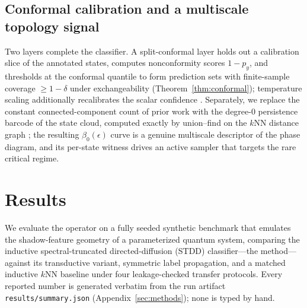 \documentclass[aps,prresearch,reprint,amsmath,amssymb,nofootinbib,superscriptaddress,floatfix]{revtex4-2}
\theoremstyle{definition}
\theoremstyle{remark}
\theoremstyle{plain}
\begin{document}
\subsection{Conformal calibration and a multiscale topology signal}
Two layers complete the classifier. A split-conformal layer holds out a calibration slice of the annotated
states, computes nonconformity scores $1-p_y$, and thresholds at the conformal quantile to form prediction
sets with finite-sample coverage $\ge1-\delta$ under exchangeability (Theorem~\ref{thm:conformal});
temperature scaling additionally recalibrates the scalar confidence \cite{guo2017calibration}. Separately,
we replace the constant connected-component count of prior work with the degree-$0$ persistence barcode of
the state cloud, computed exactly by union--find on the $k$NN distance graph
\cite{edelsbrunner2010computational,carlsson2009topology}; the resulting $\beta_0(\epsilon)$ curve is a
genuine multiscale descriptor of the phase diagram, and its per-state witness drives an active sampler that
targets the rare critical regime.

\section{Results}
\label{sec:results}
We evaluate the operator on a fully seeded synthetic benchmark that emulates the shadow-feature geometry of
a parameterized quantum system, comparing the inductive spectral-truncated directed-diffusion (STDD)
classifier---the method---against its transductive variant, symmetric label propagation, and a matched
inductive $k$NN baseline under four leakage-checked transfer protocols. Every reported number is generated
verbatim from the run artifact \texttt{results/summary.json} (Appendix~\ref{sec:methods}); none is typed by
hand.
\end{document}
